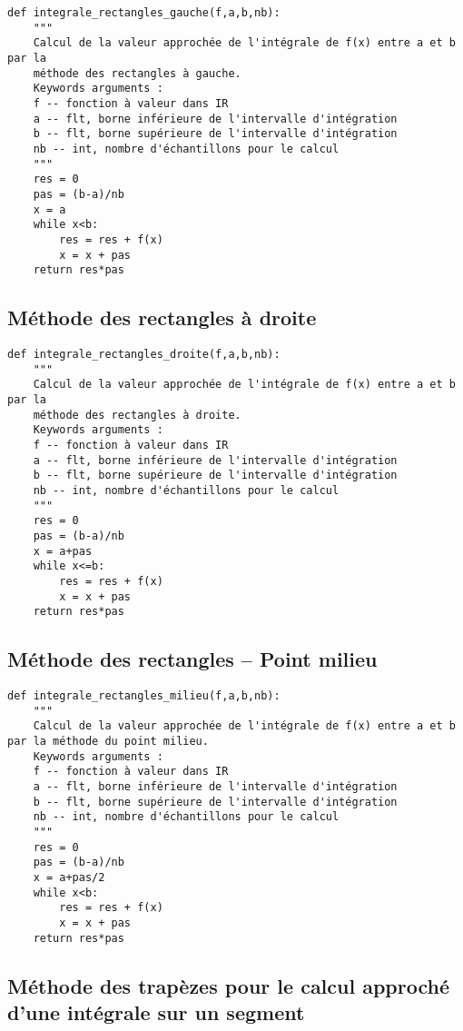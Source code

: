 \begin{lstlisting}
def integrale_rectangles_gauche(f,a,b,nb):
    """
    Calcul de la valeur approchée de l'intégrale de f(x) entre a et b par la 
    méthode des rectangles à gauche.
    Keywords arguments :
    f -- fonction à valeur dans IR
    a -- flt, borne inférieure de l'intervalle d'intégration
    b -- flt, borne supérieure de l'intervalle d'intégration
    nb -- int, nombre d'échantillons pour le calcul
    """
    res = 0
    pas = (b-a)/nb
    x = a
    while x<b:
        res = res + f(x)
        x = x + pas
    return res*pas
\end{lstlisting}

\subsection{Méthode des rectangles à droite}

\begin{lstlisting}
def integrale_rectangles_droite(f,a,b,nb):
    """
    Calcul de la valeur approchée de l'intégrale de f(x) entre a et b par la 
    méthode des rectangles à droite.
    Keywords arguments :
    f -- fonction à valeur dans IR
    a -- flt, borne inférieure de l'intervalle d'intégration
    b -- flt, borne supérieure de l'intervalle d'intégration
    nb -- int, nombre d'échantillons pour le calcul
    """
    res = 0
    pas = (b-a)/nb
    x = a+pas
    while x<=b:
        res = res + f(x)
        x = x + pas
    return res*pas
\end{lstlisting}

\subsection{Méthode des rectangles -- Point milieu}
\begin{lstlisting}
def integrale_rectangles_milieu(f,a,b,nb):
    """
    Calcul de la valeur approchée de l'intégrale de f(x) entre a et b par la méthode du point milieu.
    Keywords arguments :
    f -- fonction à valeur dans IR
    a -- flt, borne inférieure de l'intervalle d'intégration
    b -- flt, borne supérieure de l'intervalle d'intégration
    nb -- int, nombre d'échantillons pour le calcul
    """
    res = 0
    pas = (b-a)/nb
    x = a+pas/2
    while x<b:
        res = res + f(x)
        x = x + pas
    return res*pas
\end{lstlisting}

\subsection{Méthode des trapèzes pour le calcul approché d'une intégrale sur un segment}

